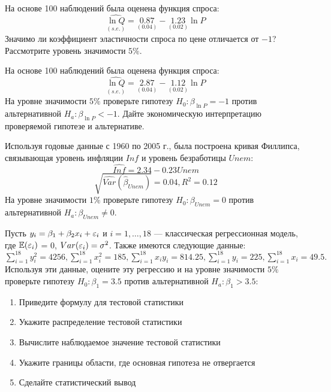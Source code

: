 \documentclass[pdftex,11pt,openany]{book}\usepackage[]{graphicx}\usepackage[]{color}
\begin{document}
\begin{solution}
\end{solution}


\begin{problem} На основе 100 наблюдений была оценена функция спроса:
\[
\underset{(s.e.)}{\widehat{\ln Q}} = \underset{(0.04)}{0.87} - \underset{(0.02)}{1.23}\ln P
\]
Значимо ли коэффициент эластичности спроса по цене отличается от $-1$? Рассмотрите уровень значимости $5\%$.
\end{problem}

\begin{solution}
\end{solution}


\begin{problem}
 На основе 100 наблюдений была оценена функция спроса: 
\[
\underset{(s.e.)}{\widehat{\ln Q}} = \underset{(0.04)}{2.87} - \underset{(0.02)}{1.12}\ln P
\]
На уровне значимости $5\%$ проверьте гипотезу  $H_0: \beta_{\ln P} = - 1$ против альтернативной $H_a: \beta_{\ln P} < -1$. Дайте экономическую интерпретацию проверяемой гипотезе и альтернативе.
\end{problem}

\begin{solution}
\end{solution}


\begin{problem}
 Используя годовые данные с 1960 по 2005 г., была построена кривая Филлипса, связывающая уровень инфляции $Inf$ и уровень безработицы $Unem$: 
\[
\widehat{Inf} = 2.34 - 0.23Unem 
\]
\[
\sqrt{\widehat{Var}(\hat{\beta}_{Unem})} = 0.04, R^2 = 0.12
\]
На уровне значимости $1\%$ проверьте гипотезу  $H_0: \beta_{Unem} = 0$ против альтернативной $H_a: \beta_{Unem} \not= 0$.
\end{problem}

\begin{solution}
\end{solution}


\begin{problem}
 Пусть $y_i = \beta_1 + \beta_2 x_i + \varepsilon_i$ и $i = 1, \dots, 18$ --- классическая регрессионная модель, где $\mathbb{E}(\varepsilon_i)$ = 0, $Var(\varepsilon_i) = \sigma^2$. Также имеются следующие данные: $\sum_{i=1}^{18} y_i^2 = 4256, \sum_{i=1}^{18} x_i^2 = 185, \sum_{i=1}^{18} x_iy_i = 814.25, \sum_{i=1}^{18} y_i = 225, \sum_{i=1}^{18} x_i = 49.5.$ Используя эти данные, оцените эту регрессию и на уровне значимости $5\%$ проверьте гипотезу $H_0: \beta_1 = 3.5$ против альтернативной $H_a: \beta_1 > 3.5$:
\begin{enumerate}
\item Приведите формулу для тестовой статистики 
\item Укажите распределение тестовой статистики
\item Вычислите наблюдаемое значение тестовой статистики
\item Укажите границы области, где основная гипотеза не отвергается
\item Сделайте статистический вывод
\end{enumerate}
\end{problem}
\end{document}
